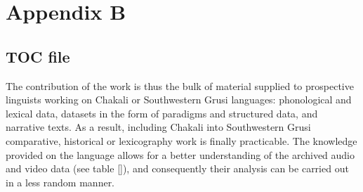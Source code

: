 
\chapter*{Appendix B}
\label{chap:TXT-text}
\pagestyle{plain}


\section*{TOC file}
\label{chap:TXT-TOC}

The contribution of the work  is thus the bulk of material  supplied to
prospective linguists working on Chakali or Southwestern
Grusi  languages: phonological and
lexical data,  datasets in the form of  paradigms and structured data, and  
narrative texts.    As a result,  including Chakali into Southwestern
Grusi
comparative, historical or lexicography work is finally practicable. The
knowledge provided on the language allows for a better understanding of the 
archived audio and video data (see table \ref{}),  and consequently  their
analysis can be carried out in a less random manner. 